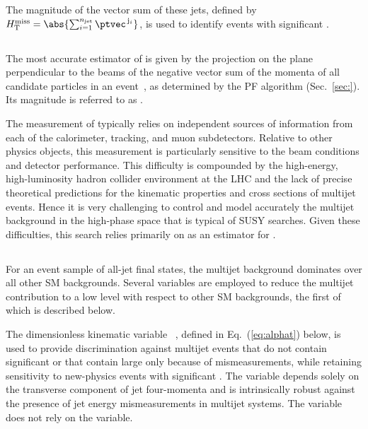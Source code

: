 The magnitude of the vector \ptvec sum of these jets, defined by
$\HTmiss = \abs{\sum_{{i}=1}^{\njet} \ptvec^{\,\mathrm{j}_i}}$, is
used to identify events with significant \ptvecmiss.

\subsection{\texorpdfstring{\ETmiss}{ETmiss}}

The most accurate estimator of \ptvecmiss is given by the projection
on the plane perpendicular to the beams of the negative vector sum of
the momenta of all candidate particles in an event~\cite{cms-met}, as
determined by the PF algorithm (Sec.~\ref{sec:}). Its magnitude is
referred to as \ETmiss.

The measurement of \met typically relies on independent sources of
information from each of the calorimeter, tracking, and muon
subdetectors. Relative to other physics objects, this measurement is
particularly sensitive to the beam conditions and detector
performance. This difficulty is compounded by the high-energy,
high-luminosity hadron collider environment at the LHC and the lack of
precise theoretical predictions for the kinematic properties and cross
sections of multijet events. Hence it is very challenging to control
and model accurately the multijet background in the high-\met phase
space that is typical of SUSY searches. Given these difficulties, this
search relies primarily on \HTmiss as an estimator for \ptvecmiss.

\subsection{\texorpdfstring{\alphat}{AlphaT}}
\label{sec:alphatdef}

For an event sample of all-jet final states, the multijet background
dominates over all other SM backgrounds. Several variables are
employed to reduce the multijet contribution to a low level with
respect to other SM backgrounds, the first of which is described
below.

The dimensionless kinematic variable \alphat~\cite{Randall:2008rw,
  CMS:2008vya, CMS-PAS-SUS-09-001}, defined in Eq.~(\ref{eq:alphat})
below, is used to provide discrimination against multijet events that
do not contain significant \ptvecmiss or that contain large \ptvecmiss
only because of \pt mismeasurements, while retaining sensitivity to
new-physics events with significant \ptvecmiss. The \alphat variable
depends solely on the transverse component of jet four-momenta and is
intrinsically robust against the presence of jet energy
mismeasurements in multijet systems. The variable does not rely on the
\ETmiss variable.

